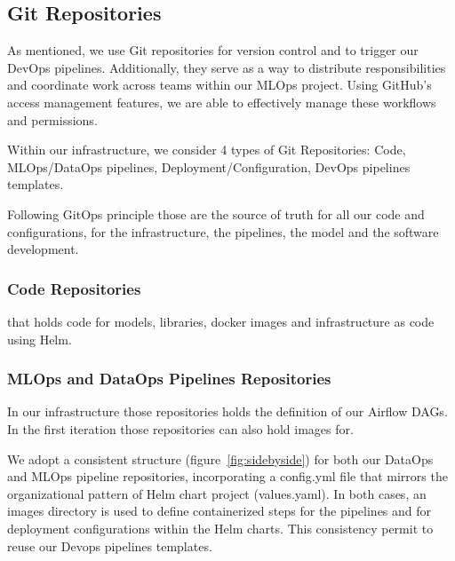 \subsection{Git Repositories}\label{subsec:git-repositories}
As mentioned, we use Git repositories for version control and to trigger our DevOps pipelines.
Additionally, they serve as a way to distribute responsibilities and coordinate work across teams within our MLOps project.
Using GitHub’s access management features, we are able to effectively manage these workflows and permissions.

Within our infrastructure, we consider 4 types of Git Repositories: Code, MLOps/DataOps pipelines, Deployment/Configuration, DevOps pipelines templates.

Following GitOps principle those are the source of truth for all our code and configurations, for the infrastructure, the pipelines, the model and the software development.


\subsubsection{Code Repositories}
that holds code for models, libraries, docker images and infrastructure as code using Helm.

\subsubsection{MLOps and DataOps Pipelines Repositories}
In our infrastructure those repositories holds the definition of our Airflow DAGs.
In the first iteration those repositories can also hold images for.

We adopt a consistent structure (figure~\ref{fig:sidebyside}) for both our DataOps and MLOps pipeline repositories, incorporating a config.yml file that mirrors the organizational pattern of Helm chart project (values.yaml).
In both cases, an images directory is used to define containerized steps for the pipelines and for deployment configurations within the Helm charts.
This consistency permit to reuse our Devops pipelines templates.

